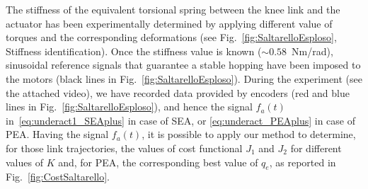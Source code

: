 % 
The stiffness of the equivalent torsional spring between the knee link and the actuator has been experimentally determined by applying different value of torques and the corresponding deformations (see Fig.~\ref{fig:SaltarelloEsploso}, Stiffness identification). Once the stiffness value is known ($\sim0.58$~Nm/rad), sinusoidal reference signals that guarantee a stable hopping have been imposed to the motors (black lines in Fig.~\ref{fig:SaltarelloEsploso}). During the experiment (see the attached video), we have recorded data provided by encoders (red and blue lines in Fig.~\ref{fig:SaltarelloEsploso}), and hence the signal $f_a(t)$ in~\eqref{eq:underact1_SEAplus} in case of SEA, or \eqref{eq:underact_PEAplus} in case of PEA. Having the signal $f_a(t)$, it is possible to apply our method to determine, for those link trajectories, the values of cost functional $J_1$ and $J_2$ for different values of $K$ and, for PEA, the corresponding best value of $q_e$, as reported in Fig.~\ref{fig:CostSaltarello}.



